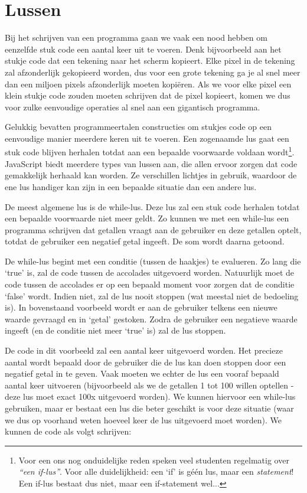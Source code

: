 \chapter{Lussen}

Bij het schrijven van een programma gaan we vaak een nood hebben om eenzelfde stuk code een aantal keer uit te voeren. Denk bijvoorbeeld aan het stukje code dat een tekening naar het scherm kopieert. Elke pixel in de tekening zal afzonderlijk gekopieerd worden, dus voor een grote tekening ga je al snel meer dan een miljoen pixels afzonderlijk moeten kopi\"eren. Als we voor elke pixel een klein stukje code zouden moeten schrijven dat de pixel kopieert, komen we dus voor zulke eenvoudige operaties al snel aan een gigantisch programma.

Gelukkig bevatten programmeertalen constructies om stukjes code op een eenvoudige manier meerdere keren uit te voeren. Een zogenaamde lus gaat een stuk code blijven herhalen totdat aan een bepaalde voorwaarde voldaan wordt\footnote{Voor een ons nog onduidelijke reden speken veel studenten regelmatig over \emph{``een if-lus''}. Voor alle duidelijkheid: een `if' is g\'e\'en lus, maar een \emph{statement}! Een if-lus bestaat dus niet, maar een if-statement wel...}. JavaScript biedt meerdere types van lussen aan, die allen ervoor zorgen dat code gemakkelijk herhaald kan worden. Ze verschillen lichtjes in gebruik, waardoor de ene lus handiger kan zijn in een bepaalde situatie dan een andere lus.

De meest algemene lus is de while-lus. Deze lus zal een stuk code herhalen totdat een bepaalde voorwaarde niet meer geldt. Zo kunnen we met een while-lus een programma schrijven dat getallen vraagt aan de gebruiker en deze getallen optelt, totdat de gebruiker een negatief getal ingeeft. De som wordt daarna getoond.


De while-lus begint met een conditie (tussen de haakjes) te evalueren. Zo lang die `true' is, zal de code tussen de accolades uitgevoerd worden. Natuurlijk moet de code tussen de accolades er op een bepaald moment voor zorgen dat de conditie `false' wordt. Indien niet, zal de lus nooit stoppen (wat meestal niet de bedoeling is). In bovenstaand voorbeeld wordt er aan de gebruiker telkens een nieuwe waarde gevraagd en in `getal' gestoken. Zodra de gebruiker een negatieve waarde ingeeft (en de conditie niet meer `true' is) zal de lus stoppen.

De code in dit voorbeeld zal een aantal keer uitgevoerd worden. Het precieze aantal wordt bepaald door de gebruiker die de lus kan doen stoppen door een negatief getal in te geven. Vaak moeten we echter de lus een vooraf bepaald aantal keer uitvoeren (bijvoorbeeld als we de getallen 1 tot 100 willen optellen - deze lus moet exact 100x uitgevoerd worden). We kunnen hiervoor een while-lus gebruiken, maar er bestaat een lus die beter geschikt is voor deze situatie (waar we dus op voorhand weten hoeveel keer de lus uitgevoerd moet worden). We kunnen de code als volgt schrijven:

